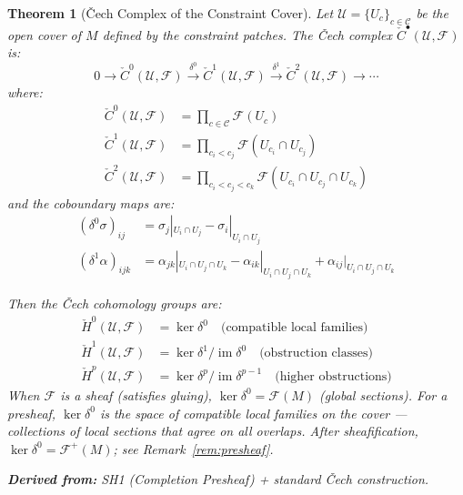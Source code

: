 \documentclass[11pt,letterpaper]{article}
\newtheorem{theorem}[conjecture]{Theorem}
\newcommand{\Cech}{\check{C}}
\newcommand{\Hcech}{\check{H}}
\newcommand{\sheaf}{\mathcal{F}}
\newcommand{\cover}{\mathcal{U}}
\newcommand{\constraint}{\mathcal{C}}
\DeclareMathOperator{\im}{im}
\begin{document}
\begin{theorem}[\v{C}ech Complex of the Constraint 
Cover]\label{conj:cech_complex}
Let $\cover = \{U_c\}_{c \in \constraint}$ be the open cover of $M$ 
defined by the constraint patches. The \v{C}ech complex $\Cech^\bullet
(\cover, \sheaf)$ is:
\begin{equation}\label{eq:cech_complex}
    0 \longrightarrow \Cech^0(\cover, \sheaf) 
    \xrightarrow{\;\delta^0\;} \Cech^1(\cover, \sheaf) 
    \xrightarrow{\;\delta^1\;} \Cech^2(\cover, \sheaf) 
    \longrightarrow \cdots
\end{equation}
where:
\begin{align}
    \Cech^0(\cover, \sheaf) &= \prod_{c \in \constraint} \sheaf(U_c) 
    \label{eq:cech0}\\
    \Cech^1(\cover, \sheaf) &= \prod_{c_i < c_j} \sheaf(U_{c_i} 
    \cap U_{c_j}) \label{eq:cech1}\\
    \Cech^2(\cover, \sheaf) &= \prod_{c_i < c_j < c_k} 
    \sheaf(U_{c_i} \cap U_{c_j} \cap U_{c_k}) \label{eq:cech2}
\end{align}
and the coboundary maps are:
\begin{align}
    (\delta^0 \sigma)_{ij} &= \sigma_j|_{U_i \cap U_j} - 
    \sigma_i|_{U_i \cap U_j} 
    \label{eq:coboundary0}\\
    (\delta^1 \alpha)_{ijk} &= \alpha_{jk}|_{U_i \cap U_j \cap U_k} - 
    \alpha_{ik}|_{U_i \cap U_j \cap U_k} + 
    \alpha_{ij}|_{U_i \cap U_j \cap U_k}
    \label{eq:coboundary1}
\end{align}

Then the \v{C}ech cohomology groups are:
\begin{align}
    \Hcech^0(\cover, \sheaf) &= \ker \delta^0 
    \quad \text{(compatible local families)} 
    \label{eq:H0}\\
    \Hcech^1(\cover, \sheaf) &= \ker \delta^1 / \im \delta^0 
    \quad \text{(obstruction classes)}
    \label{eq:H1}\\
    \Hcech^p(\cover, \sheaf) &= \ker \delta^p / \im \delta^{p-1} 
    \quad \text{(higher obstructions)}
    \label{eq:Hp}
\end{align}
When $\sheaf$ is a \emph{sheaf} (satisfies gluing), $\ker \delta^0 = 
\sheaf(M)$ (global sections). For a presheaf, $\ker \delta^0$ is the 
space of compatible local families on the cover --- collections of 
local sections that agree on all overlaps. After sheafification, 
$\ker \delta^0 = \sheaf^+(M)$; see Remark~\ref{rem:presheaf}.

\textbf{Derived from:} SH1 (Completion Presheaf) + standard \v{C}ech 
construction.


\end{theorem}
\end{document}

